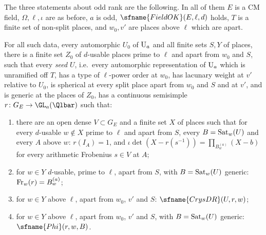 The three statements about odd rank are the following. In all of them $E$ is a CM field, $\Omega,\ell,\iota$ are as
before, $a$ is odd, $\sfname{FieldOK}(E,\ell,d)$ holds, $T$ is a finite set of non-split places, and $w_0,v'$ are places
above $\ell$ which are apart.

\begin{definition}\label{pf:galred:seeddef}
For all such data, every automorphic $U_0$ of $\mathrm{U}_a$ and all finite sets $S,Y$ of places, there is a finite set
$Z_0$ of $d$-usable places prime to $\ell$ and apart from $w_0$ and $S$, such that every \emph{seed} $U$, i.e.\ every
automorphic representation of $\mathrm{U}_a$ which is unramified off $T$, has a type of $\ell$-power order at $w_0$, has
lacunary weight at $v'$ relative to $U_0$, is spherical at every split place apart from $w_0$ and $S$ and at $v'$,
and is generic at the places of $Z_0$, has a continuous semisimple $r\colon G_E\to\GL_a(\Qlbar)$ such that:
\begin{enumerate}[label=(S\arabic*),nosep]
\item there are an open dense $V\subset G_E$ and a finite set $X$ of places such that for every $d$-usable $w\notin X$
  prime to $\ell$ and apart from $S$, every $B=\operatorname{Sat}_w(U)$ and every $A$ above $w$: $r(I_A)=1$, and
  $\iota\det(X-r(s^{-1}))=\prod_{B^{(a)}_w}(X-b)$ for every arithmetic Frobenius $s\in V$ at $A$;
\item for $w\in Y$ $d$-usable, prime to $\ell$, apart from $S$, with $B=\operatorname{Sat}_w(U)$ generic: $\operatorname{Fr}_w(r)=B^{(a)}_w$;
\item for $w\in Y$ above $\ell$, apart from $w_0$, $v'$ and $S$: $\sfname{CrysDR}(U,r,w)$;
\item for $w\in Y$ above $\ell$, apart from $w_0$, $v'$ and $S$, with $B=\operatorname{Sat}_w(U)$ generic: $\sfname{Phi}(r,w,B)$.
\end{enumerate}
\end{definition}

